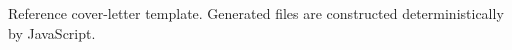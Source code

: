 \documentclass[letterpaper,10pt]{article}
\begin{document}
Reference cover-letter template. Generated files are constructed deterministically by JavaScript.
\end{document}
